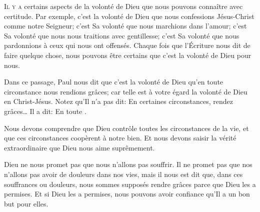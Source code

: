 \lettrine{I}{l y a} certains aspects de la volonté de Dieu
 que nous pouvons connaître avec certitude. Par exemple, c'est la volonté
 de Dieu que nous confessions Jésus-Christ comme notre Seigneur;
 c'est Sa volonté que nous marchions dans l'amour;
 c'est Sa volonté que nous nous traitions avec gentillesse;
 c'est Sa volonté que nous pardonnions à ceux qui nous ont offensés.
 Chaque fois que l'Écriture nous dit de faire quelque chose,
 nous pouvons être certains que c'est la volonté de Dieu pour nous.

Dans ce passage, Paul nous dit que c'est la volonté de Dieu \Og qu'en toute
 circonstance nous rendions grâces; car telle est à votre égard la volonté
 de Dieu en Christ-Jésus. \Fg{}
 Notez qu'Il n'a pas dit: 
 \Og En certaines circonstances, rendez grâces\dots{} \Fg{}
 Il a dit:  \Og En toute \Fg{}.


Nous devons comprendre que Dieu contrôle toutes les circonstances de la vie,
 et que ces circonstances coopèrent à notre bien.
 Et nous devons saisir la vérité extraordinaire que Dieu nous aime suprêmement.

Dieu ne nous promet pas que nous n'allons pas souffrir.
 Il ne promet pas que nos n'allons pas avoir de douleurs dans nos vies,
 mais il nous est dit que, dans ces souffrances ou douleurs,
 nous sommes supposés rendre grâces \ocadr parce que Dieu les a permises.
 Et si Dieu les a permises, nous pouvons avoir confiance qu'Il a un bon but
 pour elles.

\dvrule







